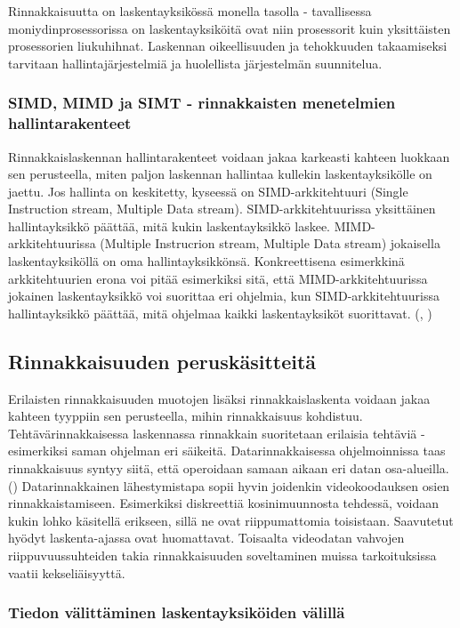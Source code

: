 Rinnakkaisuutta on laskentayksikössä monella tasolla - tavallisessa 
moniydinprosessorissa on laskentayksiköitä ovat niin prosessorit kuin
yksittäisten prosessorien liukuhihnat. Laskennan oikeellisuuden ja tehokkuuden
takaamiseksi tarvitaan hallintajärjestelmiä ja huolellista järjestelmän
suunnitelua.

\subsubsection{SIMD, MIMD ja SIMT - rinnakkaisten menetelmien hallintarakenteet}

Rinnakkaislaskennan hallintarakenteet voidaan jakaa karkeasti kahteen luokkaan sen perusteella,
miten paljon laskennan hallintaa kullekin laskentayksikölle on jaettu. Jos
hallinta on keskitetty, kyseessä on SIMD-arkkitehtuuri (Single Instruction
stream, Multiple Data stream). SIMD-arkkitehtuurissa yksittäinen
hallintayksikkö päättää, mitä kukin laskentayksikkö laskee.
MIMD-arkkitehtuurissa (Multiple Instrucrion stream, Multiple Data stream)
jokaisella laskentayksiköllä on oma hallintayksikkönsä. Konkreettisena
esimerkkinä arkkitehtuurien erona voi pitää esimerkiksi sitä, että
MIMD-arkkitehtuurissa jokainen laskentayksikkö voi suorittaa eri ohjelmia, kun
SIMD-arkkitehtuurissa hallintayksikkö päättää, mitä ohjelmaa kaikki
laskentayksiköt suorittavat. (\citealt{intro}, \citealt{rauber})

\subsection{Rinnakkaisuuden peruskäsitteitä}

Erilaisten rinnakkaisuuden muotojen lisäksi rinnakkaislaskenta voidaan jakaa
kahteen tyyppiin sen perusteella, mihin rinnakkaisuus kohdistuu.
Tehtävärinnakkaisessa laskennassa rinnakkain suoritetaan erilaisia
tehtäviä - esimerkiksi saman ohjelman eri säikeitä. Datarinnakkaisessa
ohjelmoinnissa taas rinnakkaisuus syntyy siitä, että operoidaan samaan aikaan
eri datan osa-alueilla. (\citealt{intro}) Datarinnakkainen lähestymistapa sopii hyvin
joidenkin videokoodauksen osien rinnakkaistamiseen. Esimerkiksi diskreettiä
kosinimuunnosta tehdessä, voidaan kukin lohko käsitellä erikseen, sillä ne ovat riippumattomia 
toisistaan. Saavutetut hyödyt laskenta-ajassa ovat huomattavat. Toisaalta
videodatan vahvojen riippuvuussuhteiden takia rinnakkaisuuden soveltaminen
muissa tarkoituksissa vaatii kekseliäisyyttä.

\subsubsection{Tiedon välittäminen laskentayksiköiden välillä}

